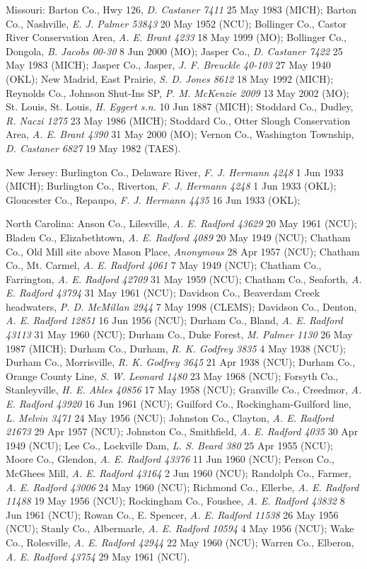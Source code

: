 \documentclass{article}
\begin{document}
Missouri:
Barton Co., Hwy 126, \textit{D. Castaner 7411} 25 May 1983 (MICH);
Barton Co., Nashville, \textit{E. J. Palmer 53843} 20 May 1952 (NCU);
Bollinger Co., Castor River Conservation Area, \textit{A. E. Brant 4233} 18 May 1999 (MO);
Bollinger Co., Dongola, \textit{B. Jacobs 00-30} 8 Jun 2000 (MO);
Jasper Co., \textit{D. Castaner 7422} 25 May 1983 (MICH);
Jasper Co., Jasper, \textit{J. F. Breuckle 40-103} 27 May 1940 (OKL);
New Madrid, East Prairie, \textit{S. D. Jones 8612}	18 May 1992 (MICH);
Reynolds Co., Johnson Shut-Ins SP, \textit{P. M. McKenzie 2009} 13 May 2002 (MO);
St. Louis, St. Louis, \textit{H. Eggert s.n.} 10 Jun 1887 (MICH);
Stoddard Co., Dudley, \textit{R. Naczi 1275} 23 May 1986 (MICH);
Stoddard Co., Otter Slough Conservation Area, \textit{A. E. Brant 4390} 31 May 2000 (MO);
Vernon Co., Washington Township, \textit{D. Castaner 6827} 19 May 1982 (TAES).

New Jersey:
Burlington Co., Delaware River, \textit{F. J. Hermann 4248} 1 Jun 1933 (MICH);
Burlington Co., Riverton, \textit{F. J. Hermann 4248} 1 Jun 1933 (OKL);
Gloucester Co., Repaupo, \textit{F. J. Hermann 4435} 16 Jun 1933 (OKL);


North Carolina:
Anson Co., Lilesville, \textit{A. E. Radford 43629} 20 May 1961 (NCU);
Bladen Co., Elizabethtown, \textit{A. E. Radford 4089} 20 May 1949 (NCU);
Chatham Co., Old Mill site above Mason Place, \textit{Anonymous} 28 Apr 1957 (NCU);
Chatham Co., Mt. Carmel, \textit{A. E. Radford 4061} 7 May 1949 (NCU);
Chatham Co., Farrington, \textit{A. E. Radford 42709} 31 May 1959 (NCU);
Chatham Co., Seaforth, \textit{A. E. Radford 43794} 31 May 1961 (NCU);
Davidson Co., Beaverdam Creek headwaters, \textit{P. D. McMillan 2944} 7 May 1998 (CLEMS);
Davidson Co., Denton, \textit{A. E. Radford 12851} 16 Jun 1956 (NCU);
Durham Co., Bland, \textit{A. E. Radford 43113} 31 May 1960 (NCU);
Durham Co., Duke Forest, \textit{M. Palmer 1130} 26 May 1987 (MICH);
Durham Co., Durham, \textit{R. K. Godfrey 3835} 4 May 1938 (NCU);
Durham Co., Morrisville, \textit{R. K. Godfrey 3645} 21 Apr 1938 (NCU);
Durham Co., Orange County Line, \textit{S. W. Leonard 1480} 23 May 1968 (NCU);
Forsyth Co., Stanleyville, \textit{H. E. Ahles 40856} 17 May 1958 (NCU);
Granville Co., Creedmor, \textit{A. E. Radford 43920} 16 Jun 1961 (NCU);
Guilford Co., Rockingham-Guilford line, \textit{L. Melvin 3471} 24 May 1956 (NCU);
Johnston Co., Clayton, \textit{A. E. Radford 21673} 29 Apr 1957 (NCU);
Johnston Co., Smithfield, \textit{A. E. Radford 4035} 30 Apr 1949 (NCU);
Lee Co., Lockville Dam, \textit{L. S. Beard 380} 25 Apr 1955 (NCU);
Moore Co., Glendon, \textit{A. E. Radford 43376} 11 Jun 1960 (NCU);
Person Co., McGhees Mill, \textit{A. E. Radford 43164} 2 Jun 1960 (NCU);
Randolph Co., Farmer, \textit{A. E. Radford 43006} 24 May 1960 (NCU);
Richmond Co., Ellerbe, \textit{A. E. Radford 11488} 19 May 1956 (NCU);
Rockingham Co., Foushee, \textit{A. E. Radford 43832} 8 Jun 1961 (NCU);
Rowan Co., E. Spencer, \textit{A. E. Radford 11538} 26 May 1956 (NCU);
Stanly Co., Albermarle, \textit{A. E. Radford 10594} 4 May 1956 (NCU);
Wake Co., Rolesville, \textit{A. E. Radford 42944} 22 May 1960 (NCU);
Warren Co., Elberon, \textit{A. E. Radford 43754} 29 May 1961 (NCU).
\end{document}
